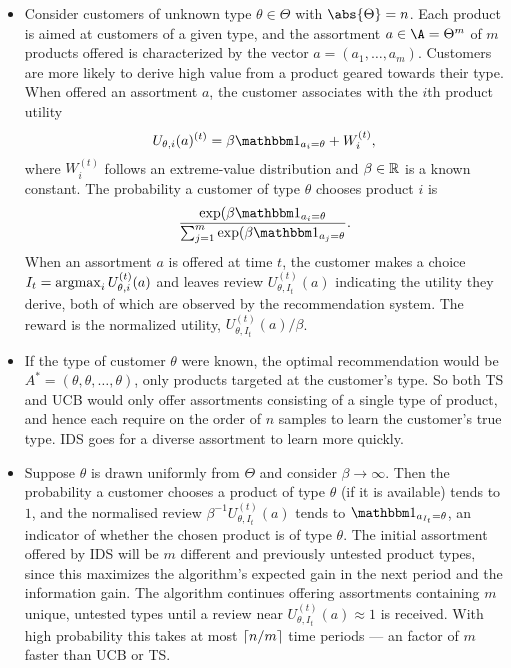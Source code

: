 \documentclass[11pt, openany]{book}
\begin{document}
\begin{example}
    \vspace*{-20pt}
    \begin{itemize}
        \item Consider customers of unknown type $\theta\in\Theta$ with $\abs{\Theta}=n$. Each product is aimed at customers of a given type, and the assortment $a\in\A=\Theta^m$ of $m$ products offered is characterized by the vector $a=(a_1,\dots,a_m)$. Customers are more likely to derive high value from a product geared towards their type. When offered an assortment $a$, the customer associates with the $i$th product utility
            \[
                U_{\theta,i}(a)^{(t)} = \beta\ind_{a_i=\theta} + W_i^{(t)}, 
            \]
            where $W_i^{(t)}$ follows an extreme-value distribution and $\beta\in\mathbb{R}$ is a known constant. The probability a customer of type $\theta$ chooses product $i$ is
            \[
                \frac{\exp(\beta\ind_{a_i=\theta}}{\sum_{j=1}^m \exp(\beta\ind_{a_j=\theta}}.
            \]
            When an assortment $a$ is offered at time $t$, the customer makes a choice $I_t = \operatorname*{argmax}_i U_{\theta,i}^{(t)} (a)$ and leaves review $U_{\theta,I_t}^{(t)}(a)$ indicating the utility they derive, both of which are observed by the recommendation system. The reward is the normalized utility, $U_{\theta,I_t}^{(t)} (a)/\beta$.
        \item If the type of customer $\theta$ were known, the optimal recommendation would be $A^* = (\theta,\theta,\dots,\theta)$, only products targeted at the customer's type. So both TS and UCB would only offer assortments consisting of a single type of product, and hence each require on the order of $n$ samples to learn the customer's true type. IDS goes for a diverse assortment to learn more quickly.
        \item Suppose $\theta$ is drawn uniformly from $\Theta$ and consider $\beta\to \infty$. Then the probability a customer chooses a product of type $\theta$ (if it is available) tends to $1$, and the normalised review $\beta^{-1}U_{\theta,I_t}^{(t)} (a)$ tends to $\ind_{a_{I_t}=\theta}$, an indicator of whether the chosen product is of type $\theta$. The initial assortment offered by IDS will be $m$ different and previously untested product types, since this maximizes the algorithm's expected gain in the next period and the information gain. The algorithm continues offering assortments containing $m$ unique, untested types until a review near $U_{\theta,I_t}^{(t)} (a)\approx 1$ is received. With high probability this takes at most $\left\lceil n/m\right\rceil$ time periods --- an factor of $m$ faster than UCB or TS.

\end{itemize}
\end{example}
\end{document}

